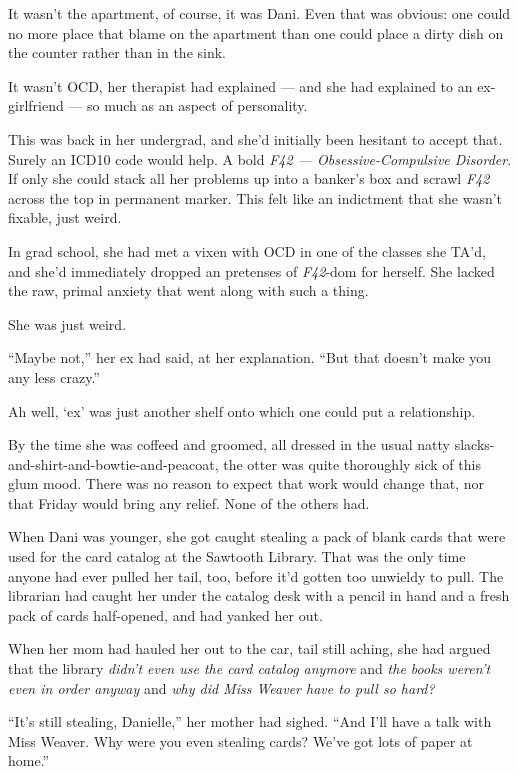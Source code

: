 It wasn't the apartment, of course, it was Dani. Even that was obvious: one could no more place that blame on the apartment than one could place a dirty dish on the counter rather than in the sink.

It wasn't OCD, her therapist had explained --- and she had explained to an ex-girlfriend --- so much as an aspect of personality.

This was back in her undergrad, and she'd initially been hesitant to accept that. Surely an ICD10 code would help. A bold \emph{F42 --- Obsessive-Compulsive Disorder}. If only she could stack all her problems up into a banker's box and scrawl \emph{F42} across the top in permanent marker. This felt like an indictment that she wasn't fixable, just weird.

In grad school, she had met a vixen with OCD in one of the classes she TA'd, and she'd immediately dropped an pretenses of \emph{F42}-dom for herself. She lacked the raw, primal anxiety that went along with such a thing.

She was just weird.

``Maybe not,'' her ex had said, at her explanation. ``But that doesn't make you any less crazy.''

Ah well, `ex' was just another shelf onto which one could put a relationship.

By the time she was coffeed and groomed, all dressed in the usual natty slacks-and-shirt-and-bowtie-and-peacoat, the otter was quite thoroughly sick of this glum mood. There was no reason to expect that work would change that, nor that Friday would bring any relief. None of the others had.

\secdiv

When Dani was younger, she got caught stealing a pack of blank cards that were used for the card catalog at the Sawtooth Library. That was the only time anyone had ever pulled her tail, too, before it'd gotten too unwieldy to pull. The librarian had caught her under the catalog desk with a pencil in hand and a fresh pack of cards half-opened, and had yanked her out.

When her mom had hauled her out to the car, tail still aching, she had argued that the library \emph{didn't even use the card catalog anymore} and \emph{the books weren't even in order anyway} and \emph{why did Miss Weaver have to pull so hard?}

``It's still stealing, Danielle,'' her mother had sighed. ``And I'll have a talk with Miss Weaver. Why were you even stealing cards? We've got lots of paper at home.''

